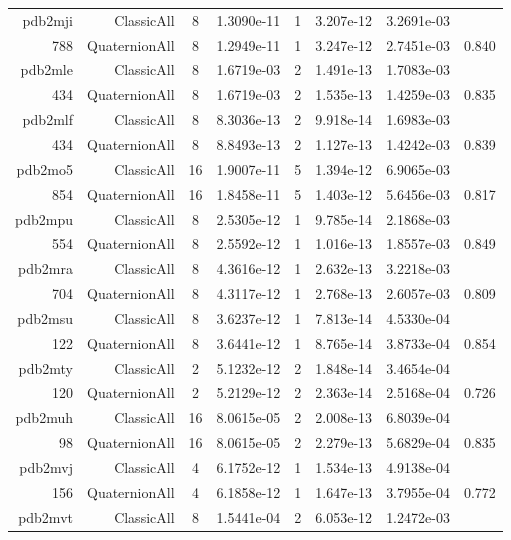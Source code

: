 \begin{xltabular}{\textwidth}{r|rcS[table-format=1.4e+2]cS[table-format=1.3e+2]S[table-format=1.4e+2]S[table-format=-1.3]}
pdb2mji & ClassicAll & 8 & 1.3090e-11 & 1 & 3.207e-12 & 3.2691e-03 & \\
788 & QuaternionAll & 8 & 1.2949e-11 & 1 & 3.247e-12 & 2.7451e-03 & 0.840\\  \addlinespace
pdb2mle & ClassicAll & 8 & 1.6719e-03 & 2 & 1.491e-13 & 1.7083e-03 & \\
434 & QuaternionAll & 8 & 1.6719e-03 & 2 & 1.535e-13 & 1.4259e-03 & 0.835\\  \addlinespace
pdb2mlf & ClassicAll & 8 & 8.3036e-13 & 2 & 9.918e-14 & 1.6983e-03 & \\
434 & QuaternionAll & 8 & 8.8493e-13 & 2 & 1.127e-13 & 1.4242e-03 & 0.839\\  \addlinespace
pdb2mo5 & ClassicAll & 16 & 1.9007e-11 & 5 & 1.394e-12 & 6.9065e-03 & \\
854 & QuaternionAll & 16 & 1.8458e-11 & 5 & 1.403e-12 & 5.6456e-03 & 0.817\\  \addlinespace
pdb2mpu & ClassicAll & 8 & 2.5305e-12 & 1 & 9.785e-14 & 2.1868e-03 & \\
554 & QuaternionAll & 8 & 2.5592e-12 & 1 & 1.016e-13 & 1.8557e-03 & 0.849\\  \addlinespace
pdb2mra & ClassicAll & 8 & 4.3616e-12 & 1 & 2.632e-13 & 3.2218e-03 & \\
704 & QuaternionAll & 8 & 4.3117e-12 & 1 & 2.768e-13 & 2.6057e-03 & 0.809\\  \addlinespace
pdb2msu & ClassicAll & 8 & 3.6237e-12 & 1 & 7.813e-14 & 4.5330e-04 & \\
122 & QuaternionAll & 8 & 3.6441e-12 & 1 & 8.765e-14 & 3.8733e-04 & 0.854\\  \addlinespace
pdb2mty & ClassicAll & 2 & 5.1232e-12 & 2 & 1.848e-14 & 3.4654e-04 & \\
120 & QuaternionAll & 2 & 5.2129e-12 & 2 & 2.363e-14 & 2.5168e-04 & 0.726\\  \addlinespace
pdb2muh & ClassicAll & 16 & 8.0615e-05 & 2 & 2.008e-13 & 6.8039e-04 & \\
98 & QuaternionAll & 16 & 8.0615e-05 & 2 & 2.279e-13 & 5.6829e-04 & 0.835\\  \addlinespace
pdb2mvj & ClassicAll & 4 & 6.1752e-12 & 1 & 1.534e-13 & 4.9138e-04 & \\
156 & QuaternionAll & 4 & 6.1858e-12 & 1 & 1.647e-13 & 3.7955e-04 & 0.772\\  \addlinespace
pdb2mvt & ClassicAll & 8 & 1.5441e-04 & 2 & 6.053e-12 & 1.2472e-03 & \\

\end{xltabular}
